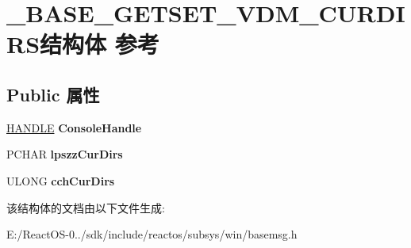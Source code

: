 \hypertarget{struct___b_a_s_e___g_e_t_s_e_t___v_d_m___c_u_r_d_i_r_s}{}\section{\+\_\+\+B\+A\+S\+E\+\_\+\+G\+E\+T\+S\+E\+T\+\_\+\+V\+D\+M\+\_\+\+C\+U\+R\+D\+I\+R\+S结构体 参考}
\label{struct___b_a_s_e___g_e_t_s_e_t___v_d_m___c_u_r_d_i_r_s}
\subsection*{Public 属性}
\begin{DoxyCompactItemize}
\item 
\mbox{\label{struct___b_a_s_e___g_e_t_s_e_t___v_d_m___c_u_r_d_i_r_s_a3f79ae45deb2ac4eba8d5c6697220a66}} 
\hyperlink{interfacevoid}{H\+A\+N\+D\+LE} {\bfseries Console\+Handle}
\item 
\mbox{\label{struct___b_a_s_e___g_e_t_s_e_t___v_d_m___c_u_r_d_i_r_s_ab554446f815a846b3c1067ddc0130939}} 
P\+C\+H\+AR {\bfseries lpszz\+Cur\+Dirs}
\item 
\mbox{\label{struct___b_a_s_e___g_e_t_s_e_t___v_d_m___c_u_r_d_i_r_s_a94ef90c6a16cb07b21284585b05f2791}} 
U\+L\+O\+NG {\bfseries cch\+Cur\+Dirs}
\end{DoxyCompactItemize}


该结构体的文档由以下文件生成\+:\begin{DoxyCompactItemize}
\item 
E\+:/\+React\+O\+S-\/0../sdk/include/reactos/subsys/win/basemsg.\+h\end{DoxyCompactItemize}
